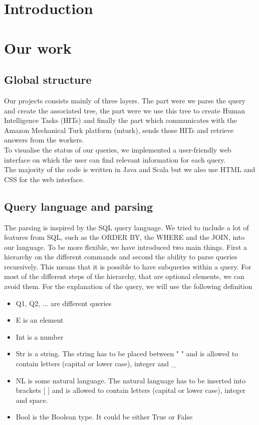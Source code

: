 \documentclass{article}
\begin{document}


\tableofcontents
\newpage


\section{Introduction}



\section{Our work} %
\subsection{Global structure}
Our projects consists mainly of three layers. The part were we parse the query and create the associated tree, the part were we use this tree to create Human Intelligence Tasks (HITs) and finally the part which communicates with the Amazon Mechanical Turk platform (mturk), sends those HITs and retrieve answers from the workers.\\
To visualise the status of our queries, we implemented a user-friendly web interface on which the user can find relevant information for each query.\\ The majority of the code is written in Java and Scala but we also use HTML and CSS for the web interface.
\subsection{Query language and parsing}
The parsing is inspired by the SQL query language. We tried to include a lot of features from SQL, such as the ORDER BY, the WHERE and the JOIN, into our language. To be more flexible, we have introduced two main things. First a hierarchy on the different commands and second the ability to parse queries recursively. This means that it is possible to have subqueries within a query.
For most of the different steps of the hierarchy, that are optional elements, we can avoid them. %
For the explanation of the query, we will use the following definition
\begin{itemize}
\item Q1, Q2, ... are different queries
\item E is an element
\item Int is a number
\item Str is a string. The string has to be placed between " " and is allowed to contain letters (capital or lower case), integer and \_
\item NL is some natural language. The natural language has to be inserted into brackets [ ] and is allowed to contain letters (capital or lower case), integer and space.
\item Bool is the Boolean type. It could be either True or False
\end{itemize}
\end{document}

